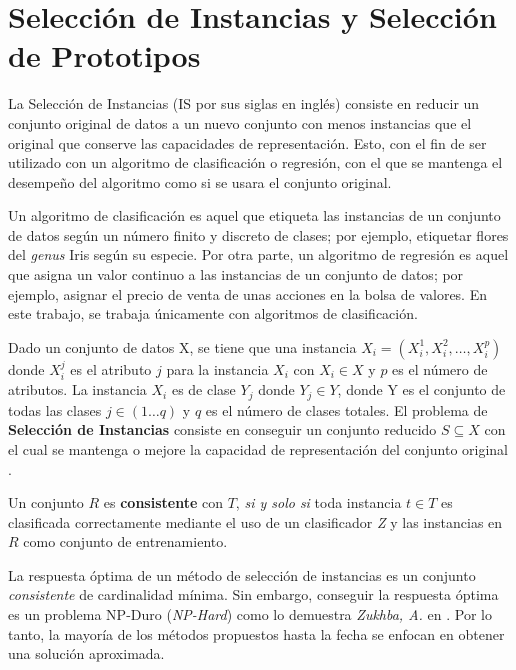 \section{Selección de Instancias y Selección de Prototipos}

La Selección de Instancias \cite{garcia2016data} (IS por sus siglas en inglés) consiste en reducir un conjunto original de datos a un nuevo conjunto con menos instancias que el original que conserve las capacidades de representación. Esto, con el fin de ser utilizado con un algoritmo de clasificación o regresión, con el que se mantenga el desempeño del algoritmo como si se usara el conjunto original.

Un algoritmo de clasificación \cite{hand2007principles} es aquel que etiqueta las instancias de un conjunto de datos según un número finito y discreto de clases; por ejemplo, etiquetar flores del \emph{genus} Iris según su especie. Por otra parte, un algoritmo de regresión \cite{hand2007principles} es aquel que asigna un valor continuo a las instancias de un conjunto de datos; por ejemplo, asignar el precio de venta de unas acciones en la bolsa de valores. En este trabajo, se trabaja únicamente con algoritmos de clasificación. \\

\begin{definicion}
Dado un conjunto de datos X, se tiene que una instancia $X_i = (X_i^1,X_i^2,\dots,X_i^p)$ donde $X_i^j$ es el atributo $j$ para la instancia $X_i$ con $X_i\in X$ y $p$ es el número de atributos. La instancia $X_i$ es de clase $Y_j$ donde $Y_j\in Y$, donde Y es el conjunto de todas las clases $j\in (1\dots q)$ y $q$ es el número de clases totales. El problema de \textbf{Selección de Instancias} consiste en conseguir un conjunto reducido $S\subseteq X$ con el cual se mantenga o mejore la capacidad de representación del conjunto original \cite{garcia2016data}.\\
\end{definicion}


\begin{definicion}
Un conjunto $R$ es \textbf{consistente} con $T$, \emph{si y solo si} toda instancia $t \in T$ es clasificada correctamente mediante el uso de un clasificador \emph{Z} y las instancias en $R$ como conjunto de entrenamiento. \cite{flores2014metaheuristics}
\end{definicion}

La respuesta óptima de un método de selección de instancias es un conjunto \emph{consistente} de cardinalidad mínima. Sin embargo, conseguir la respuesta óptima es un problema NP-Duro (\emph{NP-Hard}) como lo demuestra \emph{Zukhba, A.} en \cite{zukhba2010np}. Por lo tanto, la mayoría de los métodos propuestos hasta la fecha se enfocan en obtener una solución aproximada.

